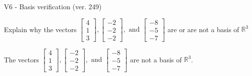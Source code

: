 \begin{exercise}
  \begin{exerciseTitle}V6 - Basis verification (ver. 249)\end{exerciseTitle}
  \begin{exerciseStatement}
    Explain why the vectors \(\left[\begin{array}{r}
4 \\
1 \\
3
\end{array}\right] , \left[\begin{array}{r}
-2 \\
-2 \\
-2
\end{array}\right] , \text{ and } \left[\begin{array}{r}
-8 \\
-5 \\
-7
\end{array}\right]\) are or are not a basis of \(\mathbb{R}^3\)	


  \end{exerciseStatement}
  \begin{exerciseAnswer}
   The vectors \(\left[\begin{array}{r}
4 \\
1 \\
3
\end{array}\right] , \left[\begin{array}{r}
-2 \\
-2 \\
-2
\end{array}\right] , \text{ and } \left[\begin{array}{r}
-8 \\
-5 \\
-7
\end{array}\right]\) 
  	 are not  a basis of \(\mathbb{R}^3\).
  


  \end{exerciseAnswer}
\end{exercise}